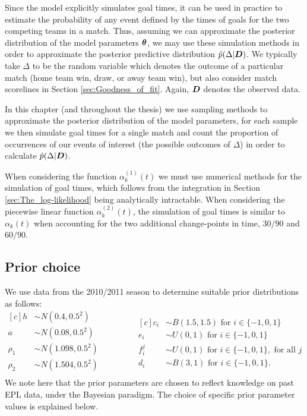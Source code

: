 Since the model explicitly simulates goal times, it can be used in practice to estimate the probability of any event
defined by the times of goals for the two competing teams in a match. Thus, assuming we can approximate the posterior
distribution of the model parameters \(\boldsymbol{\theta}\), we may use these simulation methods in order to approximate the
posterior predictive distribution \(\hat{p}(\Delta | \boldsymbol{D})\). We typically take \(\Delta\) to be the random variable
which denotes the outcome of a particular match (home team win, draw, or away team win), but also consider match
scorelines in Section \ref{sec:Goodness_of_fit}. Again, \(\boldsymbol{D}\) denotes the observed data.
 
In this chapter (and throughout the thesis) we use sampling methods to approximate the posterior distribution of the
model parameters, for each sample we then simulate goal times for a single match and count the proportion of occurrences
of our events of interest (the possible outcomes of \(\Delta\)) in order to calculate \(\hat{p}(\Delta | \boldsymbol{D})\).

When considering the function \(\alpha^{(1)}_k(t)\) we must use numerical methods for the simulation of goal times,
which follows from the integration in Section \ref{sec:The_log-likelihood} being analytically intractable. When
considering the piecewise linear function \(\alpha^{(2)}_k(t)\), the simulation of goal times is similar to
\(\alpha_k(t)\) when accounting for the two additional change-points in time, \(30/90\) and \(60/90\).

\subsection{Prior choice}
\label{priorChoice}

We use data from the 2010/2011 season to determine suitable prior distributions as follows:
\begin{equation}
\begin{aligned}[c]
h      &\sim N(0.4, 0.5^2) \\
a      &\sim N(0.08, 0.5^2) \\
\rho_1 &\sim N(1.098, 0.5^2) \\
\rho_2 &\sim N(1.504, 0.5^2) \\
\end{aligned}
\qquad\qquad
\begin{aligned}[c]
c_i   &\sim B(1.5, 1.5) \text{ for } i \in \{-1, 0, 1\} \\
e_i   &\sim U(0, 1) \text{ for } i \in \{-1, 0, 1\} \\
f_i^j &\sim U(0, 1) \text{ for } i \in \{-1, 0, 1\}, \text{ for all } j\\
d_i   &\sim B(3, 1) \text{ for } i \in \{-1, 0, 1\}.
\end{aligned}
\end{equation}
We note here that the prior parameters are chosen to reflect knowledge on past \gls{EPL} data, under the Bayesian paradigm.
The choice of specific prior parameter values is explained below.

